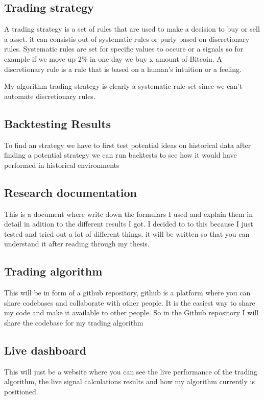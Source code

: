 \documentclass[12pt]{article}
\begin{document}
\subsection{Trading strategy}
A trading strategy is a set of rules that are used to make a decision to buy or sell a asset. it can consistis out of systematic rules or purly based on discretionary rules.
Systematic rules are set for specific values to occure or a signals so for example if we move up 2\% in one day we buy x amount of Bitcoin. A discretionary rule is a rule that is based on a human's intuition or a feeling.

My algorithm trading strategy is clearly a systematic rule set since we can't automate discretionary rules.

\subsection{Backtesting Results}
To find an strategy we have to first test potential ideas on historical data after finding a potential strategy we can run backtests to see how it would have performed in historical environments




\subsection{Research documentation}
This is a document where write down the formulars I used and explain them in detail in adition to the different results I got. I decided to to this because I just tested and tried out a lot of different things. it will be written so that you can understand it after reading through my thesis.



\subsection{Trading algorithm}
This will be in form of a github repository, github is a platform where you can share codebases and collaborate with other people. 
It is the easiest way to share my code and make it available to other people. So in the Github repository I will share the codebase for my trading algorithm


\subsection{Live dashboard}
This will just be a website where you can see the live performance of the trading algorithm, the live signal calculations results and how my algorithm currently is positioned.
\end{document}

